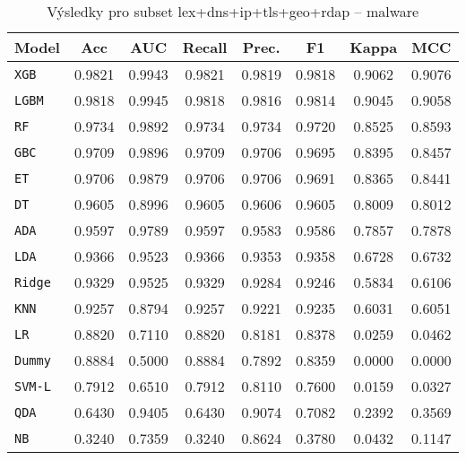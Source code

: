 \begin{table}[H]
  \centering
  \small
  \caption{Výsledky pro subset lex+dns+ip+tls+geo+rdap – malware}
  \begin{tabular}{|l|c|c|c|c|c|c|c|}
    \hline
    \textbf{Model} & \textbf{Acc} & \textbf{AUC} & \textbf{Recall} & \textbf{Prec.} & \textbf{F1} & \textbf{Kappa} & \textbf{MCC} \\
    \hline
    \texttt{XGB} & 0.9821 & 0.9943 & 0.9821 & 0.9819 & 0.9818 & 0.9062 & 0.9076 \\
    \texttt{LGBM} & 0.9818 & 0.9945 & 0.9818 & 0.9816 & 0.9814 & 0.9045 & 0.9058 \\
    \texttt{RF} & 0.9734 & 0.9892 & 0.9734 & 0.9734 & 0.9720 & 0.8525 & 0.8593 \\
    \texttt{GBC} & 0.9709 & 0.9896 & 0.9709 & 0.9706 & 0.9695 & 0.8395 & 0.8457 \\
    \texttt{ET} & 0.9706 & 0.9879 & 0.9706 & 0.9706 & 0.9691 & 0.8365 & 0.8441 \\
    \texttt{DT} & 0.9605 & 0.8996 & 0.9605 & 0.9606 & 0.9605 & 0.8009 & 0.8012 \\
    \texttt{ADA} & 0.9597 & 0.9789 & 0.9597 & 0.9583 & 0.9586 & 0.7857 & 0.7878 \\
    \texttt{LDA} & 0.9366 & 0.9523 & 0.9366 & 0.9353 & 0.9358 & 0.6728 & 0.6732 \\
    \texttt{Ridge} & 0.9329 & 0.9525 & 0.9329 & 0.9284 & 0.9246 & 0.5834 & 0.6106 \\
    \texttt{KNN} & 0.9257 & 0.8794 & 0.9257 & 0.9221 & 0.9235 & 0.6031 & 0.6051 \\
    \texttt{LR} & 0.8820 & 0.7110 & 0.8820 & 0.8181 & 0.8378 & 0.0259 & 0.0462 \\
    \texttt{Dummy} & 0.8884 & 0.5000 & 0.8884 & 0.7892 & 0.8359 & 0.0000 & 0.0000 \\
    \texttt{SVM-L} & 0.7912 & 0.6510 & 0.7912 & 0.8110 & 0.7600 & 0.0159 & 0.0327 \\
    \texttt{QDA} & 0.6430 & 0.9405 & 0.6430 & 0.9074 & 0.7082 & 0.2392 & 0.3569 \\
    \texttt{NB} & 0.3240 & 0.7359 & 0.3240 & 0.8624 & 0.3780 & 0.0432 & 0.1147 \\
    \hline
  \end{tabular}
\end{table}
\vspace{0.5cm}

